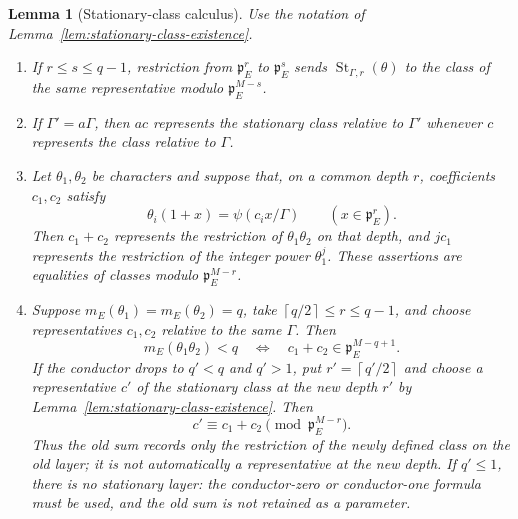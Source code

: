 \documentclass[11pt]{amsart}
\newtheorem{lemma}[theorem]{Lemma}
\theoremstyle{definition}
\theoremstyle{remark}
\newcommand{\p}{\mathfrak p}
\newcommand{\ceil}[1]{\left\lceil #1\right\rceil}
\begin{document}
\begin{lemma}[Stationary-class calculus]
\label{lem:stationary-class-calculus}
Use the notation of Lemma~\ref{lem:stationary-class-existence}.
\begin{enumerate}[label=(\alph*)]
\item If $r\le s\le q-1$, restriction from $\p_E^r$ to $\p_E^s$
      sends $\operatorname{St}_{\Gamma,r}(\theta)$ to the class of the
      same representative modulo $\p_E^{M-s}$.
\item If $\Gamma'=a\Gamma$, then $ac$ represents the stationary class
      relative to $\Gamma'$ whenever $c$ represents the class relative
      to $\Gamma$.
\item Let $\theta_1,\theta_2$ be characters and suppose that, on a
      common depth $r$, coefficients $c_1,c_2$ satisfy
      \[
       \theta_i(1+x)=\psi(c_ix/\Gamma)\qquad(x\in\p_E^r).
      \]
      Then $c_1+c_2$ represents the restriction of
      $\theta_1\theta_2$ on that depth, and $jc_1$ represents the
      restriction of the integer power $\theta_1^j$.  These assertions
      are equalities of classes modulo $\p_E^{M-r}$.
\item Suppose $m_E(\theta_1)=m_E(\theta_2)=q$, take
      $\ceil{q/2}\le r\le q-1$, and choose representatives $c_1,c_2$
      relative to the same $\Gamma$.  Then
      \begin{equation}\label{eq:stationary-leading-cancellation}
       m_E(\theta_1\theta_2)<q
       \quad\Longleftrightarrow\quad
       c_1+c_2\in\p_E^{M-q+1}.
      \end{equation}
      If the conductor drops to $q'<q$ and $q'>1$, put
      $r'=\ceil{q'/2}$ and choose a representative $c'$ of the
      stationary class at the new depth $r'$ by
      Lemma~\ref{lem:stationary-class-existence}.  Then
      \begin{equation}\label{eq:dropped-class-old-layer}
       c'\equiv c_1+c_2\pmod{\p_E^{M-r}}.
      \end{equation}
      Thus the old sum records only the restriction of the newly
      defined class on the old layer; it is not automatically a
      representative at the new depth.  If $q'\le1$, there is no
      stationary layer: the conductor-zero or conductor-one formula
      must be used, and the old sum is not retained as a parameter.
\end{enumerate}
\end{lemma}
\end{document}
